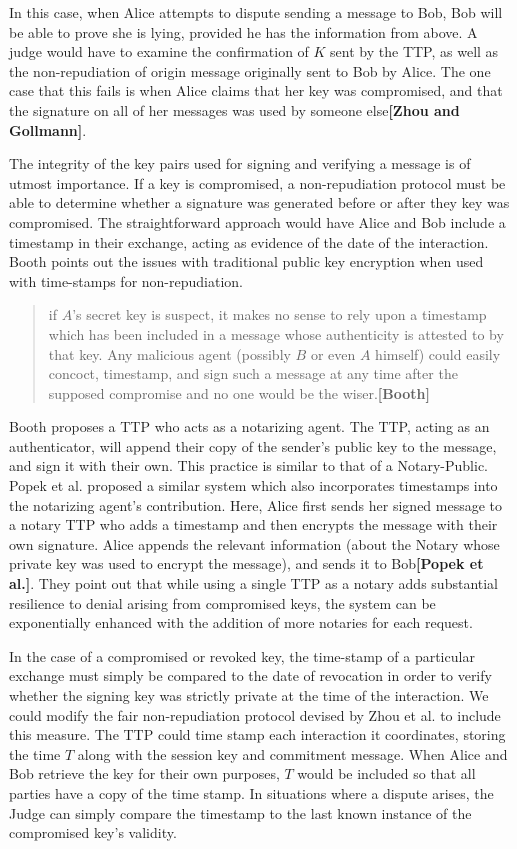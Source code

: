 \documentclass[12pt]{article}
\newcommand{\lcite}[1]
{{\bfseries\color{orange}[#1]}}
\begin{document}
			In this case, when Alice attempts to dispute sending a message to Bob, Bob will be able to prove she is lying, provided he has the information from above. A judge would have to examine the confirmation of $K$ sent by the TTP, as well as the non-repudiation of origin message originally sent to Bob by Alice. The one case that this fails is when Alice claims that her key was compromised, and that the signature on all of her messages was used by someone else\lcite{Zhou and Gollmann}.

			The integrity of the key pairs used for signing and verifying a message is of utmost importance. If a key is compromised, a non-repudiation protocol must be able to determine whether a signature was generated before or after they key was compromised. The straightforward approach would have Alice and Bob include a timestamp in their exchange, acting as evidence of the date of the interaction. Booth points out the issues with traditional public key encryption when used with time-stamps for non-repudiation.
			\begin{quote}
				if $A$'s secret key is suspect, it makes no sense to rely upon a timestamp which has been included in a message whose authenticity is attested to by that key. Any malicious agent (possibly $B$ or even $A$ himself) could easily concoct, timestamp, and sign such a message at any time after the supposed compromise and no one would be the wiser.\lcite{Booth}
			\end{quote}

			Booth proposes a TTP who acts as a notarizing agent. The TTP, acting as an authenticator, will append their copy of the sender's public key to the message, and sign it with their own. This practice is similar to that of a Notary-Public. Popek et al. proposed a similar system which also incorporates timestamps into the notarizing agent's contribution. Here, Alice first sends her signed message to a notary TTP who adds a timestamp and then encrypts the message with their own signature. Alice appends the relevant information (about the Notary whose private key was used to encrypt the message), and sends it to Bob\lcite{Popek et al.}. They point out that while using a single TTP as a notary adds substantial resilience to denial arising from compromised keys, the system can be exponentially enhanced with the addition of more notaries for each request.

			In the case of a compromised or revoked key, the time-stamp of a particular exchange must simply be compared to the date of revocation in order to verify whether the signing key was strictly private at the time of the interaction. We could modify the fair non-repudiation protocol devised by Zhou et al. to include this measure. The TTP could time stamp each interaction it coordinates, storing the time $T$ along with the session key and commitment message. When Alice and Bob retrieve the key for their own purposes, $T$ would be included so that all parties have a copy of the time stamp. In situations where a dispute arises, the Judge can simply compare the timestamp to the last known instance of the compromised key's validity.
\end{document}

